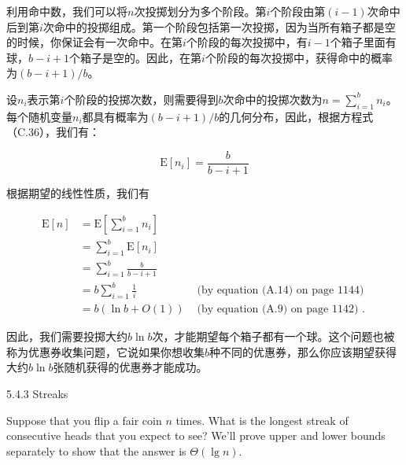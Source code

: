 \documentclass[lang=cn,newtx,10pt,scheme=chinese]{elegantbook}
\begin{document}
利用命中数，我们可以将$n$次投掷划分为多个阶段。第$i$个阶段由第$(i-1)$次命中后到第$i$次命中的投掷组成。第一个阶段包括第一次投掷，因为当所有箱子都是空的时候，你保证会有一次命中。在第$i$个阶段的每次投掷中，有$i-1$个箱子里面有球，$b-i+1$个箱子是空的。因此，在第$i$个阶段的每次投掷中，获得命中的概率为$(b-i+1)/b$。

设$n_i$表示第$i$个阶段的投掷次数，则需要得到$b$次命中的投掷次数为$n=\sum_{i=1}^b n_i$。每个随机变量$n_i$都具有概率为$(b-i+1)/b$的几何分布，因此，根据方程式（C.36），我们有：

$$
\mathrm{E}\left[n_i\right]=\frac{b}{b-i+1}
$$

根据期望的线性性质，我们有

$$
\begin{array}{rlr}
\mathrm{E}[n] & =\mathrm{E}\left[\sum_{i=1}^b n_i\right] \\
& =\sum_{i=1}^b \mathrm{E}\left[n_i\right] & \\
& =\sum_{i=1}^b \frac{b}{b-i+1} & \\
& =b \sum_{i=1}^b \frac{1}{i} & \text { (by equation (A.14) on page 1144) } \\
& =b(\ln b+O(1)) & \text { (by equation (A.9) on page 1142) } .
\end{array}
$$

因此，我们需要投掷大约$b\ln b$次，才能期望每个箱子都有一个球。这个问题也被称为优惠券收集问题，它说如果你想收集$b$种不同的优惠券，那么你应该期望获得大约$b\ln b$张随机获得的优惠券才能成功。

5.4.3 Streaks

Suppose that you flip a fair coin $n$ times. What is the longest streak of consecutive heads that you expect to see? We'll prove upper and lower bounds separately to show that the answer is $\Theta(\lg n)$.
\end{document}
